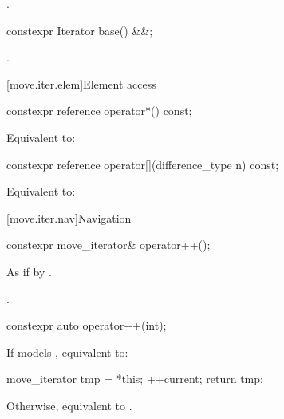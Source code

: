 \begin{itemdescr}
\pnum
\returns
{}.
\end{itemdescr}

%
\begin{itemdecl}
constexpr Iterator base() &&;
\end{itemdecl}

\begin{itemdescr}
\pnum
\returns
{}.
\end{itemdescr}

[move.iter.elem]{Element access}

%
\begin{itemdecl}
constexpr reference operator*() const;
\end{itemdecl}

\begin{itemdescr}
\pnum
\effects
Equivalent to: 
\end{itemdescr}

%
\begin{itemdecl}
constexpr reference operator[](difference_type n) const;
\end{itemdecl}

\begin{itemdescr}
\pnum
\effects
Equivalent to: 
\end{itemdescr}

[move.iter.nav]{Navigation}

%
\begin{itemdecl}
constexpr move_iterator& operator++();
\end{itemdecl}

\begin{itemdescr}
\pnum
\effects
As if by .

\pnum
\returns
{}.
\end{itemdescr}

%
\begin{itemdecl}
constexpr auto operator++(int);
\end{itemdecl}

\begin{itemdescr}
\pnum
\effects
If  models , equivalent to:
\begin{codeblock}
move_iterator tmp = *this;
++current;
return tmp;
\end{codeblock}
Otherwise, equivalent to .
\end{itemdescr}

